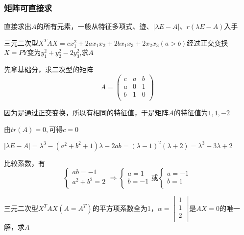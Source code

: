 \documentclass[lang=cn,10pt]{elegantbook}
\begin{document}
\subsubsection{矩阵可直接求}
直接求出$A$的所有元素，一般从特征多项式、迹、$|\lambda E-A|$、$r(\lambda E-A)$入手
\begin{example}
	三元二次型$X^{T}AX=cx_{1}^{2}+2ax_{1}x_{2}+2bx_{1}x_{3}+2x_{2}x_{3}(a>b)$经过正交变换$X=PY$变为$y^{2}_{1}+y^{2}_{2}-2y^{2}_{3}$,求$A$
\end{example}
\begin{solution}
	
	先拿基础分，求二次型的矩阵
	\begin{equation*}
		A=\left( \begin{matrix}
			c&		a&		b\\
			a&		0&		1\\
			b&		1&		0\\
		\end{matrix} \right) 
	\end{equation*}
	
	因为是通过正交变换，所以有相同的特征值，于是矩阵$A$的特征值为$1,1,-2$
	
	由$tr(A)=0,$可得$c=0$
	
	$|\lambda E-A|=\lambda^{3}-(a^{2}+b^{2}+1)\lambda-2ab=(\lambda-1)^{2}(\lambda+2)=\lambda^{3}-3\lambda+2$
	
	比较系数，有
	\begin{equation*}
		\begin{cases}
			ab=-1\\
			a^2+b^2=2\\
		\end{cases}\Rightarrow \begin{cases}
			a=1\\
			b=-1\\
		\end{cases}\text{或}\begin{cases}
			a=-1\\
			b=1\\
		\end{cases}
	\end{equation*}
\end{solution}
\begin{example}
	三元二次型$X^{T}AX(A=A^{T})$的平方项系数全为1，$\alpha=\left[ \begin{array}{c}
		1\\
		1\\
		2\\
	\end{array} \right] $是$AX=0$的唯一解，求$A$
\end{example}
\end{document}
